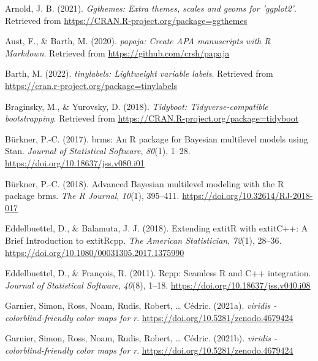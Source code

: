 \documentclass[
  man,floatsintext]{apa6}
\newlength{\cslhangindent}
\newlength{\cslentryspacingunit} %
\newenvironment{CSLReferences}[2] %
 {%
  \setlength{\parindent}{0pt}
  \ifodd #1
  \let\oldpar\par
  \def\par{\hangindent=\cslhangindent\oldpar}
  \fi
  \setlength{\parskip}{#2\cslentryspacingunit}
 }%
 {}
\begin{document}
\hypertarget{refs}{}
\begin{CSLReferences}{1}{0}
\leavevmode{}%
Arnold, J. B. (2021). \emph{Ggthemes: Extra themes, scales and geoms for 'ggplot2'}. Retrieved from \url{https://CRAN.R-project.org/package=ggthemes}

\leavevmode{}%
Aust, F., \& Barth, M. (2020). \emph{{papaja}: {Create} {APA} manuscripts with {R Markdown}}. Retrieved from \url{https://github.com/crsh/papaja}

\leavevmode{}%
Barth, M. (2022). \emph{{tinylabels}: Lightweight variable labels}. Retrieved from \url{https://cran.r-project.org/package=tinylabels}

\leavevmode{}%
Braginsky, M., \& Yurovsky, D. (2018). \emph{Tidyboot: Tidyverse-compatible bootstrapping}. Retrieved from \url{https://CRAN.R-project.org/package=tidyboot}

\leavevmode{}%
Bürkner, P.-C. (2017). {brms}: An {R} package for {Bayesian} multilevel models using {Stan}. \emph{Journal of Statistical Software}, \emph{80}(1), 1--28. \url{https://doi.org/10.18637/jss.v080.i01}

\leavevmode{}%
Bürkner, P.-C. (2018). Advanced {Bayesian} multilevel modeling with the {R} package {brms}. \emph{The R Journal}, \emph{10}(1), 395--411. \url{https://doi.org/10.32614/RJ-2018-017}

\leavevmode{}%
Eddelbuettel, D., \& Balamuta, J. J. (2018). {Extending extit{R} with extit{C++}: A Brief Introduction to extit{Rcpp}}. \emph{The American Statistician}, \emph{72}(1), 28--36. \url{https://doi.org/10.1080/00031305.2017.1375990}

\leavevmode{}%
Eddelbuettel, D., \& François, R. (2011). {Rcpp}: Seamless {R} and {C++} integration. \emph{Journal of Statistical Software}, \emph{40}(8), 1--18. \url{https://doi.org/10.18637/jss.v040.i08}

\leavevmode{}%
Garnier, Simon, Ross, Noam, Rudis, Robert, \ldots{} Cédric. (2021a). \emph{{viridis} - colorblind-friendly color maps for r}. \url{https://doi.org/10.5281/zenodo.4679424}

\leavevmode{}%
Garnier, Simon, Ross, Noam, Rudis, Robert, \ldots{} Cédric. (2021b). \emph{{viridis} - colorblind-friendly color maps for r}. \url{https://doi.org/10.5281/zenodo.4679424}


\end{CSLReferences}
\end{document}
